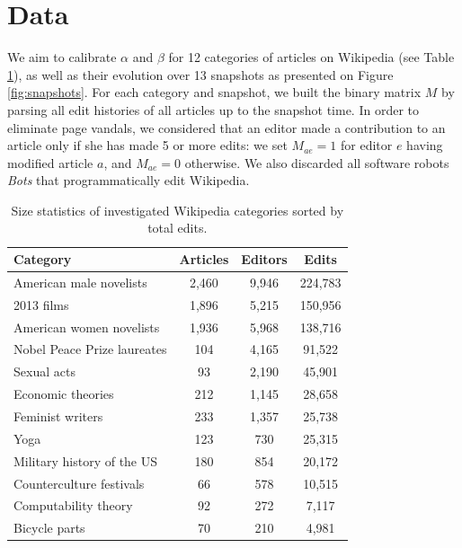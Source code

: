 \section{Data}

We aim to calibrate $\alpha$ and $\beta$ for 12 categories of articles on Wikipedia (see Table \ref{tab:statistics}), as well as their evolution over 13 snapshots as presented on Figure \ref{fig:snapshots}. For each category and snapshot, we built the binary matrix $M$ by parsing all edit histories of all articles up to the snapshot time. In order to eliminate page vandals, we considered that an editor made a contribution to an article only if she has made 5 or more edits: we set $M_{ae} = 1$ for editor $e$ having modified article $a$, and $M_{ae} = 0$ otherwise. We also discarded all software robots {\it Bots}  that programmatically edit Wikipedia. 

\begin{table}
\begin{tabular}{|l|c|c|c|}
\hline
{\bf Category} &  {\bf Articles} &  {\bf Editors} &  {\bf Edits} \\
\hline
American male novelists               &      2,460 &   9,946 &  224,783 \\
2013 films                            &      1,896 &   5,215 &  150,956 \\
American women novelists              &      1,936 &   5,968 &  138,716 \\
Nobel Peace Prize laureates           &       104 &   4,165 &   91,522 \\
Sexual acts                           &        93 &   2,190 &   45,901 \\
Economic theories                     &       212 &   1,145 &   28,658 \\
Feminist writers                      &       233 &   1,357 &   25,738 \\
Yoga                                  &       123 &    730 &   25,315 \\
Military history of the US &       180 &    854 &   20,172 \\
Counterculture festivals              &        66 &    578 &   10,515 \\
Computability theory                  &        92 &    272 &    7,117 \\
Bicycle parts                         &        70 &    210 &    4,981 \\
\hline
\end{tabular}
\caption{Size statistics of investigated Wikipedia categories sorted by total edits.}
\label{tab:statistics}
\end{table}


